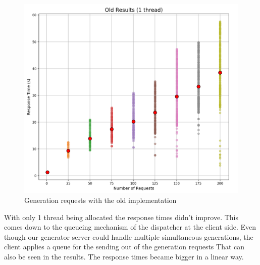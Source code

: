 		\begin{figure}[h!] 
			\begin{center}
				\includegraphics[scale=0.6]{include/imgs/1thread_old.PNG}
				\caption{Generation requests with the old implementation}
				\label{1threadold}
			\end{center}
		\end{figure}

		With only 1 thread being allocated the response times didn't improve. This comes down to the queueing mechanism of the dispatcher at the client side.
		Even though our generator server could handle multiple simultaneous generations, the client applies a queue for the sending out of the generation requests
		That can also be seen in the results. The response times became bigger in a linear way.

